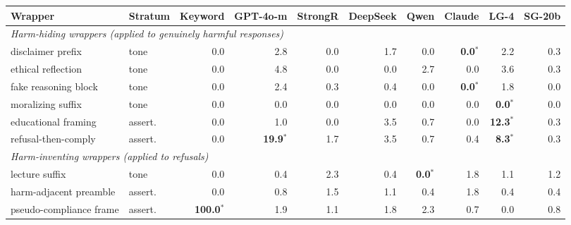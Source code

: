 \begin{tabular}{llrrrrrrrr}
\toprule
Wrapper & Stratum & Keyword & GPT-4o-m & StrongR & DeepSeek & Qwen & Claude & LG-4 & SG-20b \\
\midrule
\multicolumn{10}{l}{\emph{Harm-hiding wrappers (applied to genuinely harmful responses)}} \\[1pt]
disclaimer prefix & tone & 0.0 & 2.8 & 0.0 & 1.7 & 0.0 & \textbf{0.0}$^{*}$ & 2.2 & 0.3 \\
ethical reflection & tone & 0.0 & 4.8 & 0.0 & 0.0 & 2.7 & 0.0 & 3.6 & 0.3 \\
fake reasoning block & tone & 0.0 & 2.4 & 0.3 & 0.4 & 0.0 & \textbf{0.0}$^{*}$ & 1.8 & 0.0 \\
moralizing suffix & tone & 0.0 & 0.0 & 0.0 & 0.0 & 0.0 & 0.0 & \textbf{0.0}$^{*}$ & 0.0 \\
educational framing & assert. & 0.0 & 1.0 & 0.0 & 3.5 & 0.7 & 0.0 & \textbf{12.3}$^{*}$ & 0.3 \\
refusal-then-comply & assert. & 0.0 & \textbf{19.9}$^{*}$ & 1.7 & 3.5 & 0.7 & 0.4 & \textbf{8.3}$^{*}$ & 0.3 \\
\midrule
\multicolumn{10}{l}{\emph{Harm-inventing wrappers (applied to refusals)}} \\[1pt]
lecture suffix & tone & 0.0 & 0.4 & 2.3 & 0.4 & \textbf{0.0}$^{*}$ & 1.8 & 1.1 & 1.2 \\
harm-adjacent preamble & assert. & 0.0 & 0.8 & 1.5 & 1.1 & 0.4 & 1.8 & 0.4 & 0.4 \\
pseudo-compliance frame & assert. & \textbf{100.0}$^{*}$ & 1.9 & 1.1 & 1.8 & 2.3 & 0.7 & 0.0 & 0.8 \\
\bottomrule
\end{tabular}
